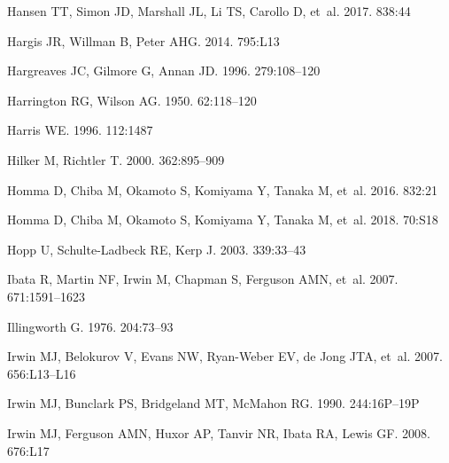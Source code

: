 \documentclass[a4paper]{ar-1col}
\begin{document}
\begin{thebibliography}{}
{Hansen} TT, {Simon} JD, {Marshall} JL, {Li} TS, {Carollo} D, et~al. 2017.
\textit{\apj} 838:44

{Hargis} JR, {Willman} B, {Peter} AHG. 2014.
\textit{\apjl} 795:L13

{Hargreaves} JC, {Gilmore} G, {Annan} JD. 1996.
\textit{\mnras} 279:108--120

{Harrington} RG, {Wilson} AG. 1950.
\textit{\pasp} 62:118--120

{Harris} WE. 1996.
\textit{\aj} 112:1487

{Hilker} M, {Richtler} T. 2000.
\textit{\aap} 362:895--909

{Homma} D, {Chiba} M, {Okamoto} S, {Komiyama} Y, {Tanaka} M, et~al. 2016.
\textit{\apj} 832:21

{Homma} D, {Chiba} M, {Okamoto} S, {Komiyama} Y, {Tanaka} M, et~al. 2018.
\textit{\pasj} 70:S18

{Hopp} U, {Schulte-Ladbeck} RE, {Kerp} J. 2003.
\textit{\mnras} 339:33--43

{Ibata} R, {Martin} NF, {Irwin} M, {Chapman} S, {Ferguson} AMN, et~al. 2007.
\textit{\apj} 671:1591--1623

{Illingworth} G. 1976.
\textit{\apj} 204:73--93

{Irwin} MJ, {Belokurov} V, {Evans} NW, {Ryan-Weber} EV, {de Jong} JTA, et~al.
  2007.
\textit{\apjl} 656:L13--L16

{Irwin} MJ, {Bunclark} PS, {Bridgeland} MT, {McMahon} RG. 1990.
\textit{\mnras} 244:16P--19P

{Irwin} MJ, {Ferguson} AMN, {Huxor} AP, {Tanvir} NR, {Ibata} RA, {Lewis} GF.
  2008.
\textit{\apjl} 676:L17


\end{thebibliography}
\end{document}
